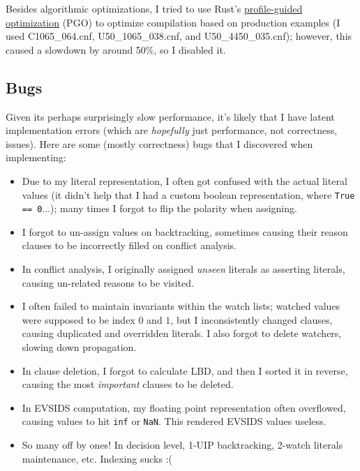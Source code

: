 \documentclass[11pt]{article}
\begin{document}
Besides algorithmic optimizations, I tried to use Rust's
\href{https://doc.rust-lang.org/rustc/profile-guided-optimization.html}{profile-guided optimization}
(PGO) to optimize compilation based on production examples (I used C1065\_064.cnf, U50\_1065\_038.cnf,
and U50\_4450\_035.cnf); however, this caused a slowdown by around 50\%, so I disabled it.


\subsection{Bugs}

Given its perhaps surprisingly slow performance, it's likely that I have latent implementation
errors (which are \textit{hopefully} just performance, not correctness, issues). Here are some
(mostly correctness) bugs that I discovered when implementing:
\begin{itemize}
    \item Due to my literal representation, I often got confused with the actual literal values (it
        didn't help that I had a custom boolean representation, where \texttt{True == 0}...); many
        times I forgot to flip the polarity when assigning.
    \item I forgot to un-assign values on backtracking, sometimes causing their reason clauses to be
        incorrectly filled on conflict analysis.
    \item In conflict analysis, I originally assigned \textit{unseen} literals as asserting
        literals, causing un-related reasons to be visited.
    \item I often failed to maintain invariants within the watch lists; watched values were supposed
        to be index $0$ and $1$, but I inconsistently changed clauses, causing duplicated and
        overridden literals. I also forgot to delete watchers, slowing down propagation.
    \item In clause deletion, I forgot to calculate LBD, and then I sorted it in reverse, causing
        the most \textit{important} clauses to be deleted.
    \item In EVSIDS computation, my floating point representation often overflowed, causing values
        to hit \texttt{inf} or \texttt{NaN}. This rendered EVSIDS values useless.
    \item So many off by ones! In decision level, 1-UIP backtracking, 2-watch literals maintenance,
        etc.  Indexing sucks :(
\end{itemize}
\end{document}
